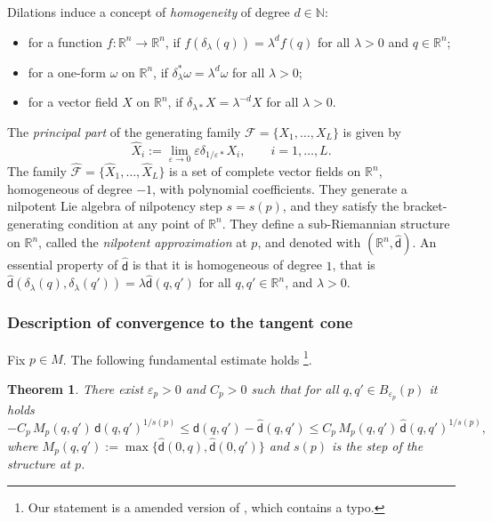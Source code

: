 \documentclass[11pt,a4paper]{article}
\theoremstyle{plain}
\newtheorem{theorem}{Theorem}[section]
\theoremstyle{definition}
\theoremstyle{remark}
\numberwithin{equation}{section}
\newcommand{\R}{\mathbb{R}} %
\newcommand{\N}{\mathbb{N}} %
\newcommand{\sfd}{\mathsf d}
\begin{document}
Dilations induce a concept of \emph{homogeneity} of degree $d\in \N$:
\begin{itemize}
\item for a function $f:\R^n \to \R^n$, if $f(\delta_\lambda(q)) = \lambda^d f(q)$ for all $\lambda >0$ and $q\in \R^n$;
\item for a one-form $\omega$ on $\R^n$, if $\delta_\lambda^* \omega = \lambda^d \omega$ for all $\lambda>0$;
\item for a vector field $X$ on $\R^n$, if $\delta_{\lambda*} X = \lambda^{-d} X$ for all $\lambda >0$.
\end{itemize}
The \emph{principal part} of the generating family $\mathscr{F}=\{X_1,\dots,X_L\}$ is given by
\begin{equation}\label{eq:defXhat}
\hat{X}_i:= \lim_{\varepsilon \to 0} \varepsilon \delta_{1/\varepsilon*} X_i, \qquad i=1,\dots,L.
\end{equation}
The family $\hat{\mathscr{F}}=\{\hat{X}_1,\dots,\hat{X}_L\}$ is a set of complete vector fields on $\R^n$, homogeneous of degree $-1$, with polynomial coefficients. They generate a nilpotent Lie algebra of nilpotency step $s=s(p)$, and they satisfy the bracket-generating condition at any point of $\R^n$. They define a sub-Riemannian structure on $\R^n$, called the \emph{nilpotent approximation} at $p$, and denoted with $(\R^n,\hat{\sfd})$. An essential property of $\hat{\sfd}$ is that it is homogeneous of degree $1$, that is $\hat{\sfd}(\delta_\lambda(q),\delta_\lambda(q')) = \lambda \hat{\sfd}(q,q')$ for all $q,q'\in \R^n$, and $\lambda>0$.

\subsubsection{Description of convergence to the tangent cone}\label{s:desc-convergence}

Fix $p\in M$. The following fundamental estimate holds \cite[Thm.\@ 7.32]{Bellaiche}\footnote{Our statement is a amended version of \cite[Thm.\@ 7.32]{Bellaiche}, which contains a typo.}.
\begin{theorem}\label{thm:bellaiche}
There exist $\varepsilon_p>0$ and $C_p>0$ such that for all $q,q'\in B_{\varepsilon_p}(p)$ it holds
\begin{equation}
-C_p\,  M_p(q,q')\,  \sfd(q,q')^{1/s(p)} \leq \sfd(q,q') - \hat{\sfd}(q,q') \leq C_p \, M_p(q,q') \, \hat{\sfd}(q,q')^{1/s(p)},
\end{equation}
where $M_p(q,q'):=\max\{\hat{\sfd}(0,q),\hat{\sfd}(0,q')\}$ and $s(p)$ is the step of the structure at $p$.
\end{theorem}
\end{document}
